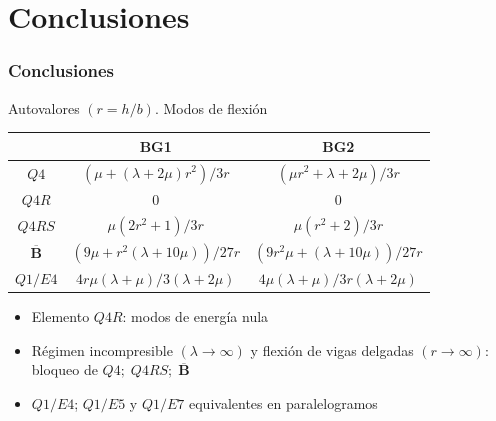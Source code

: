 \documentclass{beamer}
\begin{document}
\section{Conclusiones}
\begin{frame}
\frametitle{Conclusiones}
Autovalores $(r=h/b)$. Modos de flexión
\begin{center}
\begin{small}
\begin{tabular}{||c|c|c||}
\hline \hline
& BG1 & BG2 \\ \hline \hline
$Q4$             &$(\mu+(\lambda+2\mu)r^2)/3r$&
$(\mu r^2+\lambda+2\mu)/3r$      \\
\hline
$Q4R$            &$0$
&
$0$
\\ \hline
$Q4RS$
&$\mu(2r^2+1)/3r$
&
$\mu(r^2+2)/3r$
\\
\hline
$\overline{\bm{B}}$&$(9\mu+r^2(\lambda+10\mu))/27r$
&
$(9r^2\mu+(\lambda+10\mu))/27r$
\\
\hline
$Q1/E4$
&$4r\mu(\lambda+\mu)/3(\lambda+2\mu)$
&
$4\mu(\lambda+\mu)/3r(\lambda+2\mu)$\\
\hline
\end{tabular}
\end{small}
\end{center}
\begin{itemize}
\item Elemento $Q4R$: modos de energía nula
\item Régimen incompresible $(\lambda\rightarrow\infty)$ y flexión de vigas
delgadas $(r\rightarrow\infty)$: bloqueo de
$Q4;\;Q4RS;\; \overline{\bm{B}}$
\item $Q1/E4$; $Q1/E5$ y $Q1/E7$ equivalentes en paralelogramos
\end{itemize}
\end{frame}
\end{document}
